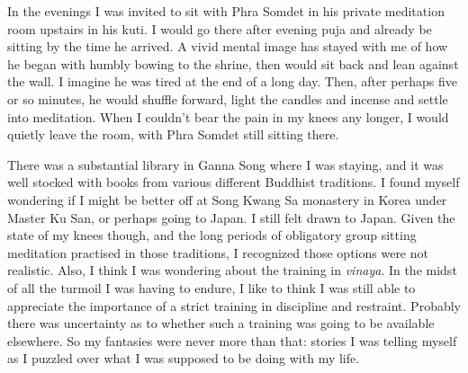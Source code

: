In the evenings I was invited to sit with Phra Somdet in his private
meditation room upstairs in his kuti. I would go there after evening
puja and already be sitting by the time he arrived. A vivid mental image
has stayed with me of how he began with humbly bowing to the shrine,
then would sit back and lean against the wall. I imagine he was tired at
the end of a long day. Then, after perhaps five or so minutes, he would
shuffle forward, light the candles and incense and settle into
meditation. When I couldn't bear the pain in my knees any longer, I
would quietly leave the room, with Phra Somdet still sitting there.

There was a substantial library in Ganna Song where I was staying, and
it was well stocked with books from various different Buddhist
traditions. I found myself wondering if I might be better off at
Song Kwang Sa\cite{song} monastery in Korea under Master Ku San, or perhaps going
to Japan. I still felt drawn to Japan. Given the state of my knees
though, and the long periods of obligatory group sitting meditation
practised in those traditions, I recognized those options were not
realistic. Also, I think I was wondering about the training in
\emph{vinaya}. In the midst of all the turmoil I was having to endure, I
like to think I was still able to appreciate the importance of a strict
training in discipline and restraint. Probably there was uncertainty as
to whether such a training was going to be available elsewhere. So my
fantasies were never more than that: stories I was telling myself as I
puzzled over what I was supposed to be doing with my life.

